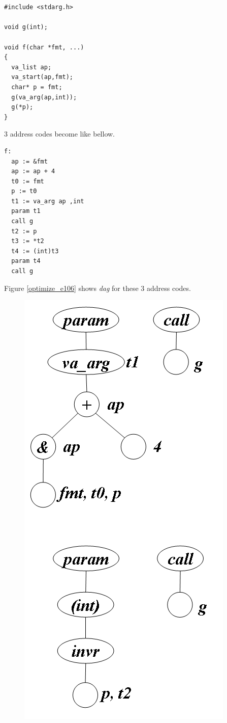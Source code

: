 \begin{Example}
\label{optimize_e105}
\begin{verbatim}


#include <stdarg.h>

void g(int);

void f(char *fmt, ...)
{
  va_list ap;
  va_start(ap,fmt);
  char* p = fmt;
  g(va_arg(ap,int));
  g(*p);
}
\end{verbatim}
3 address codes become like bellow.
\begin{verbatim}
f:
  ap := &fmt
  ap := ap + 4
  t0 := fmt
  p := t0
  t1 := va_arg ap ,int
  param t1
  call g
  t2 := p
  t3 := *t2
  t4 := (int)t3
  param t4
  call g
\end{verbatim}
Figure \ref{optimize_e106} shows {\em dag} for these 3 address codes.
\begin{figure}[htbp]
\begin{center}
\begin{htmlonly}
\includegraphics[width=0.546\linewidth,height=1.2\linewidth]{opt046.png}
\end{htmlonly}
\begin{latexonly}

\end{latexonly}
\end{center}
\end{figure}
\end{Example}
